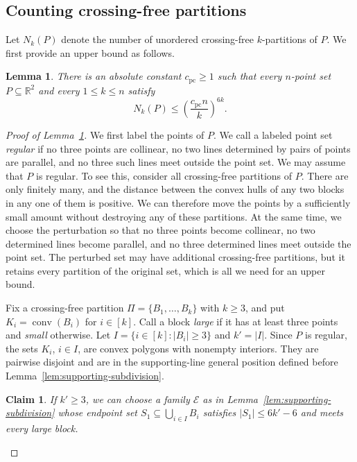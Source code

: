 \documentclass[11pt]{article}
\newtheorem{lemma}[theorem]{Lemma}
\newtheorem{claim}[theorem]{Claim}
\theoremstyle{definition}
\newcommand*{\abs}[1]{\lvert#1\rvert}
\newcommand{\R}{\mathbb{R}}
\newcommand{\conv}{\operatorname{conv}}
\begin{document}
\subsection{Counting crossing-free partitions}

Let \(N_{k}(P)\) denote the number of unordered crossing-free \(k\)-partitions of \(P\). We first provide an upper bound as follows.

\begin{lemma}\label{lem:planar-count}
There is an absolute constant \(c_{\mathrm{pc}}\ge1\) such that every \(n\)-point set \(P\subseteq\R^{2}\) and every \(1\le k\le n\) satisfy
\[
N_{k}(P)\le\left(\frac{c_{\mathrm{pc}}n}{k}\right)^{6k}.
\]
\end{lemma}

\begin{proof}[Proof of Lemma~\ref{lem:planar-count}]
We first label the points of \(P\). We call a labeled point set \emph{regular} if no three points are collinear, no two lines determined by pairs of points are parallel, and no three such lines meet outside the point set. We may assume that \(P\) is regular. To see this, consider all crossing-free partitions of \(P\). There are only finitely many, and the distance between the convex hulls of any two blocks in any one of them is positive. We can therefore move the points by a sufficiently small amount without destroying any of these partitions. At the same time, we choose the perturbation so that no three points become collinear, no two determined lines become parallel, and no three determined lines meet outside the point set. The perturbed set may have additional crossing-free partitions, but it retains every partition of the original set, which is all we need for an upper bound.

Fix a crossing-free partition \(\Pi=\{B_{1},\ldots,B_{k}\}\) with \(k\ge3\), and put \(K_{i}=\conv(B_{i})\) for \(i\in[k]\). Call a block \emph{large} if it has at least three points and \emph{small} otherwise. Let \(I=\{i\in[k]:\abs{B_{i}}\ge3\}\) and \(k'=\abs{I}\). Since \(P\) is regular, the sets \(K_{i}\), \(i\in I\), are convex polygons with nonempty interiors. They are pairwise disjoint and are in the supporting-line general position defined before Lemma~\ref{lem:supporting-subdivision}.

\begin{claim}\label{claim:small-support}
If \(k'\ge3\), we can choose a family \(\mathcal{E}\) as in Lemma~\ref{lem:supporting-subdivision} whose endpoint set \(S_{1}\subseteq\bigcup_{i\in I}B_{i}\) satisfies \(\abs{S_{1}}\le6k'-6\) and meets every large block.
\end{claim}


\end{proof}
\end{document}
